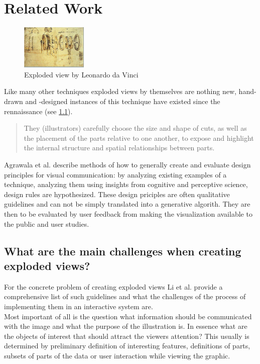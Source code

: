 \chapter{Related Work}

\begin{figure}
  \begin{center}
    \includegraphics[width=0.28\textwidth]{chapters/figures/davinci}
  \end{center}
  \caption{Exploded view by Leonardo da Vinci}
  \label{fig:davinci}
\end{figure}
Like many other techniques exploded views by themselves are nothing new, hand-drawn and -designed instances of this technique have existed since the rennaissance (see \ref{fig:davinci}). 
\begin {quote}
They (illustrators) carefully choose the size and shape of cuts, as well as the placement of the parts relative to one another, to expose and highlight the internal structure and spatial relationships between parts.\cite{Agrawala:2011:DPV:1924421.1924439}
\end{quote}
Agrawala et al. \cite{Agrawala:2011:DPV:1924421.1924439} describe methods of how to generally create and evaluate design principles for visual communication: by analyzing existing examples of a technique, analyzing them using insights from cognitive and perceptive science, design rules are hypothesized. These design priciples are often qualitative guidelines and can not be simply translated into a generative algorith. They are then to be evaluated by user feedback from making the visualization available to the public and user studies.\\
\section{What are the main challenges when creating exploded views?}
For the concrete problem of creating exploded views Li et al.\cite{proc:Li:2008:AGI} provide a comprehensive list of such guidelines and what the challenges of the process of implementing them in an interactive system are.\\
Most important of all is the question what information should be communicated with the image and what the purpose of the illustration is. In essence what are the objects of interest that should attract the viewers attention? This usually is determined by preliminary definition of interesting features, definitions of parts, subsets of parts of the data or user interaction while viewing the graphic.
